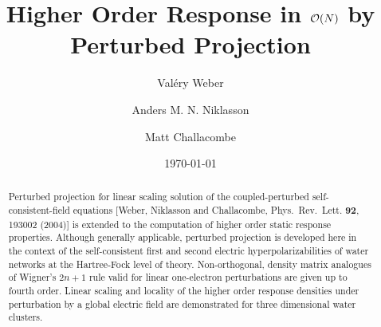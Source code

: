 \documentclass[prl,twocolumn,showpacs,twocolumngrid,superbib]{revtex4}
\begin{document}
\title{Higher Order Response in ${\cal O}(N)$ by Perturbed Projection} 

\author{Val\'ery Weber}
\author{Anders M. N. Niklasson}
\author{Matt Challacombe}

\date{\today}

\begin{abstract}
Perturbed projection  for linear scaling solution of the coupled-perturbed 
self-consistent-field equations 
[Weber, Niklasson and  Challacombe, Phys.\ Rev.\ Lett. {\bf 92}, 193002 (2004)] 
is extended to the computation of higher order static response properties.
Although generally applicable, perturbed projection is developed here 
in the context of the self-consistent first and second electric hyperpolarizabilities 
of water networks at the Hartree-Fock level of theory. 
Non-orthogonal, density matrix analogues of Wigner's $2n+1$ rule valid for linear one-electron perturbations 
are given up to fourth order.  Linear scaling and locality of the higher order response densities under perturbation 
by a global electric field are demonstrated for three dimensional water clusters.  
\end{abstract}



\maketitle
\end{document}
